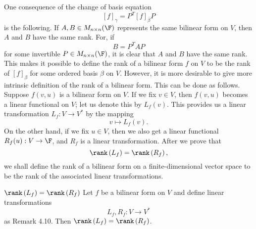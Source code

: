 \documentclass[math_245.tex]{subfiles}
\begin{document}
    \begin{remark}
        One consequence of the change of basis equation
        \begin{equation*}
            \left[ f \right] _\gamma = P^T\left[ f \right] _\beta P
        \end{equation*}
        is the following. If $A,B\in M_{n\times n}(\F)$ represents the same bilinear form on $V$, then $A$ and $B$ have the same rank. For, if
        \begin{equation*}
            B = P^TAP
        \end{equation*}
        for some invertible $P\in M_{n\times n}(\F)$, it is clear that $A$ and $B$ have the same rank. This makes it possible to define the rank of a bilinear form $f$ on $V$ to be the rank of $\left[ f \right] _\beta$ for some ordered basis $\beta$ on $V$. However, it is more desirable to give more intrinsic definition of the rank of a bilinear form. This can be done as follows. Suppose $f\left( v,u \right)$ is a bilinear form on $V$. If we fix $v\in V$, then $f(v,u)$ becomes a linear functional on $V$; let us denote this by $L_f(v)$. This provides us a linear transformation $L_f:V\to V^*$ by the mapping
        \begin{equation*}
            v\mapsto L_f(v).
        \end{equation*}
        On the other hand, if we fix $u\in V$, then we also get a linear functional $R_f(u):V\to \F$, and $R_f$ is a linear transformation. After we prove that
        \begin{equation*}
            \rank\left( L_f \right) = \rank\left( R_f \right),
        \end{equation*}
        we shall define the rank of a bilinear form on a finite-dimensional vector space to be the rank of the associated linear transformations.
    \end{remark}

    \begin{prop}{$\rank\left( L_f \right) = \rank\left( R_f \right)$}
        Let $f$ be a bilinear form on $V$ and define linear transformations
        \begin{equation*}
            L_f,R_f:V\to V^*
        \end{equation*}
        as Remark 4.10. Then $\rank\left( L_f \right) = \rank\left( R_f \right)$.
    \end{prop}
\end{document}
